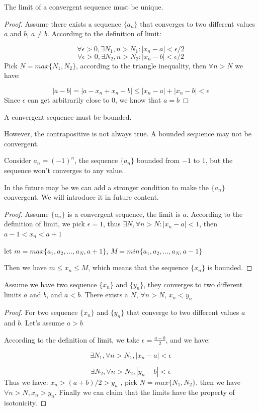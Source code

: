 \begin{theorem}
The limit of a convergent sequence must be unique.
\end{theorem}
\begin{proof}
Assume there exists a sequence $\{a_n\}$ that converges to two different values $a$ and $b$, $a\neq b$. According to the definition of limit:

\[
\forall\epsilon>0, \exists N_1, n>N_1:|x_n - a|< \epsilon/2
\]
\[
\forall\epsilon>0, \exists N_2, n>N_2:|x_n - b|< \epsilon/2
\]
Pick $N=max\{N_1,N_2\}$, according to the triangle inequality, then $\forall n>N$ we have:

\[
|a-b| = |a-x_n+x_n-b| \leq |x_n-a|+|x_n-b|<\epsilon
\]
Since $\epsilon$ can get arbitrarily close to $0$, we know that $a=b$ 
\end{proof}

\begin{theorem}
A convergent sequence must be bounded.
\end{theorem}
\begin{remark}
However, the contrapositive is not always true. A bounded sequence may not be convergent.

Consider $a_n = (-1)^n$, the sequence $\{a_n\}$ bounded from $-1$ to $1$, but the sequence won't converges to any value.

In the future may be we can add a stronger condition to make the $\{a_n\}$ convergent. We will introduce it in future content.
\end{remark}

\begin{proof}
Assume $\{a_n\}$ is a convergent sequence, the limit is $a$. According to the definition of limit, we pick $\epsilon = 1$, thus $\exists N, \forall n > N:|x_n-a|<1$, then $a-1<x_n<a+1$

let $m = max\{a_1, a_2, ..., a_N, a+1\}$, $M = min\{a_1, a_2, ..., a_N, a-1\}$

Then we have $m \leq x_n \leq M$, which means that the sequence $\{x_n\}$ is bounded.
\end{proof}

\begin{theorem}[isotonicity]
Assume we have two sequence $\{x_n\}$ and $\{y_n\}$, they converges to two different limits $a$ and $b$, and $a<b$. There exists a $N$, $\forall n>N$, $x_n<y_n$
\end{theorem}

\begin{proof}
For two sequence $\{x_n\}$ and $\{y_n\}$ that converge to two different values $a$ and $b$. Let's assume $a>b$

According to the definition of limit, we take $\epsilon = \frac{a-b}{2}$, and we have:

\[
\exists N_1, \forall n>N_1, |x_n-a| < \epsilon
\]

\[
\exists N_2, \forall n>N_2, |y_n-b| < \epsilon
\]
Thus we have: $x_n > (a+b)/2 >y_n$ , pick $N = max \{N_1,N_2\}$, then we have $\forall n > N, x_n>y_n$. Finally we can claim that the limits have the property of isotonicity.
\end{proof}

